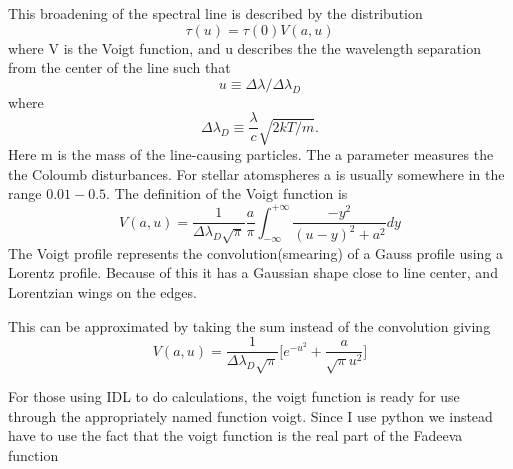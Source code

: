 \documentclass{aa}   %
\begin{document}
This broadening of the spectral line is described by the distribution
\begin{equation}
 \tau(u) = \tau(0)V(a,u)
\end{equation}\label{distribution}
where V is the Voigt function, and u describes the the wavelength separation from the center of the line such that
\begin{equation}
 u \equiv \Delta\lambda/\Delta\lambda_D
\end{equation}
where
\begin{equation}
 \Delta\lambda_D \equiv \frac{\lambda}{c} \sqrt{2kT/m}.
\end{equation}
Here m is the mass of the line-causing particles.
The a parameter measures the the Coloumb disturbances. For stellar atomspheres a is usually somewhere in the range $0.01 - 0.5$. The definition of the Voigt function is
\begin{equation}
 V(a,u) = \frac{1}{\Delta\lambda_D\sqrt{\pi}}\frac{a}{\pi}\int_{-\infty}^{+\infty}\frac{-y^2}{(u-y)^2 + a^2}dy
\end{equation}\label{Voigt}
The Voigt profile represents the convolution(smearing) of a Gauss profile using a Lorentz profile. Because of this it has a Gaussian shape close to line center, and Lorentzian wings on the edges.

This can be approximated by taking the sum instead of the convolution giving 
\begin{equation}
 V(a,u) = \frac{1}{\Delta\lambda_D\sqrt{\pi}} \bigg[e^{-u^2} + \frac{a}{\sqrt{\pi}u^2}\bigg]
\end{equation}\label{Voigt_approx}

For those using IDL to do calculations, the voigt function is ready for use through the appropriately named function voigt.
Since I use python we instead have to use the fact that the voigt function is the real part of the Fadeeva function
\end{document}
